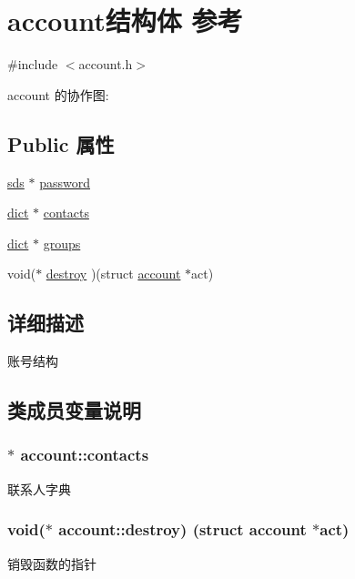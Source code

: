 \hypertarget{structaccount}{}\section{account结构体 参考}
\label{structaccount}


{\ttfamily \#include $<$account.\+h$>$}



account 的协作图\+:
\subsection*{Public 属性}
\begin{DoxyCompactItemize}
\item 
\hyperlink{structsds}{sds} $\ast$ \hyperlink{structaccount_a3e45fe694a28895f58b011f410f3f57f}{password}
\item 
\hyperlink{structdict}{dict} $\ast$ \hyperlink{structaccount_ab8f06f05514d9d0f6744875561a4ae74}{contacts}
\item 
\hyperlink{structdict}{dict} $\ast$ \hyperlink{structaccount_a957e1ae193761d02468d729a7ee842a2}{groups}
\item 
void($\ast$ \hyperlink{structaccount_a1626cfddfd556e10730fc554c3a056aa}{destroy} )(struct \hyperlink{structaccount}{account} $\ast$act)
\end{DoxyCompactItemize}


\subsection{详细描述}
账号结构 

\subsection{类成员变量说明}
\subsubsection[{\texorpdfstring{contacts}{contacts}}]{$\ast$ account\+::contacts}\hypertarget{structaccount_ab8f06f05514d9d0f6744875561a4ae74}{}\label{structaccount_ab8f06f05514d9d0f6744875561a4ae74}
联系人字典 
\subsubsection[{\texorpdfstring{destroy}{destroy}}]{\setlength{\rightskip}{0pt plus 5cm}void($\ast$ account\+::destroy) (struct {\bf account} $\ast$act)}\hypertarget{structaccount_a1626cfddfd556e10730fc554c3a056aa}{}\label{structaccount_a1626cfddfd556e10730fc554c3a056aa}
销毁函数的指针 
